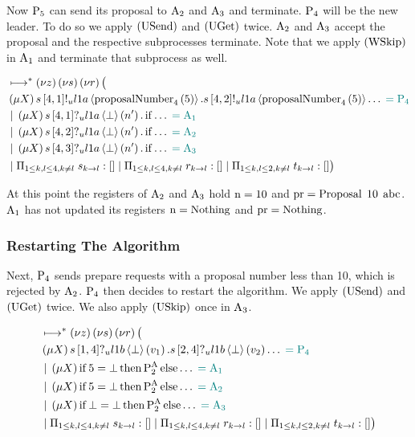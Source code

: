 Now $\Proposer{5}$ can send its proposal to $\Acceptor{2}$ and $\Acceptor{3}$ and terminate.
$\Proposer{4}$ will be the new leader.
To do so we apply $\RUsend$ and $\RUget$ twice.
$\Acceptor{2}$ and $\Acceptor{3}$ accept the proposal and the respective subprocesses terminate.
Note that we apply $\RWskip$ in $\Acceptor{1}$ and terminate that subprocess as well.

\begin{align*}
&\mapstostar \NuChannels \big (\\
&\Mu{\RecursionVariable} \SendUnreliableP{s}{4}{1}{\LOneA}{\proposalNumber{5}{4}}.\SendUnreliableP{s}{4}{2}{\LOneA}{\proposalNumber{5}{4}}\dots \comment{= \Proposer{4}}\\
&\Or \Mu{\RecursionVariable} \ReceiveUnreliableP{s}{4}{1}{\LOneA}{\bot}{n'}.\If{\dots} \comment{= \Acceptor{1}}\\
&\Or \Mu{\RecursionVariable} \ReceiveUnreliableP{s}{4}{2}{\LOneA}{\bot}{n'}.\If{\dots} \comment{= \Acceptor{2}}\\
&\Or \Mu{\RecursionVariable} \ReceiveUnreliableP{s}{4}{3}{\LOneA}{\bot}{n'}.\If{\dots} \comment{= \Acceptor{3}}\\
&\Or \InnerSessionQueues{s}
\Or \InnerSessionQueues{r}
\Or \OuterSessionQueues
\big )
\end{align*}

At this point the registers of $\Acceptor{2}$ and $\Acceptor{3}$ hold $\NumberRegister = 10$ and $\ProposalRegister = \ProposalC{10}{\ABC}$.
$\Acceptor{1}$ has not updated its registers $\NumberRegister = \Nothing$ and $\ProposalRegister = \Nothing$.

\subsubsection{Restarting The Algorithm}
Next, $\Proposer{4}$ sends prepare requests with a proposal number less than 10, which is rejected by $\Acceptor{2}$.
$\Proposer{4}$ then decides to restart the algorithm.
We apply $\RUsend$ and $\RUget$ twice.
We also apply $\RUskip$ once in $\Acceptor{3}$.

\begin{align*}
&\mapstostar \NuChannels \big (\\
&\Mu{\RecursionVariable} \ReceiveUnreliableP{s}{1}{4}{\LOneB}{\bot}{v_1}.\ReceiveUnreliableP{s}{2}{4}{\LOneB}{\bot}{v_2}\dots \comment{= \Proposer{4}}\\
&\Or \Mu{\RecursionVariable} \If{5 = \bot} \Then{\PaTwo} \Else{\dots} \comment{= \Acceptor{1}}\\
&\Or \Mu{\RecursionVariable} \If{5 = \bot} \Then{\PaTwo} \Else{\dots} \comment{= \Acceptor{2}}\\
&\Or \Mu{\RecursionVariable} \If{\bot = \bot} \Then{\PaTwo} \Else{\dots} \comment{= \Acceptor{3}}\\
&\Or \InnerSessionQueues{s}
\Or \InnerSessionQueues{r}
\Or \OuterSessionQueues
\big )
\end{align*}

